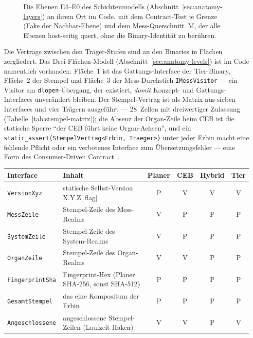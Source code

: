 \begin{nurkurz}
\begin{figure}[htbp]
\begin{tikzpicture}
\end{tikzpicture}
\caption[Die Ebenen E4--E0 im Code]{Die Ebenen E4--E0 des Schichtenmodells (Abschnitt~\ref{sec:anatomy-layers}) an ihrem Ort im Code,
mit dem Contract-Test je Grenze (Fake der Nachbar-Ebene) und dem Mess-Querschnitt~M, der alle Ebenen
host-seitig quert, ohne die Binary-Identität zu berühren.}\label{fig:impl-layers}
\end{figure}

Die Verträge zwischen den Träger-Stufen sind an den Binaries in Flächen zergliedert. Das
Drei-Flächen-Modell (Abschnitt~\ref{sec:anatomy-levels}) ist im Code namentlich vorhanden: Fläche~1 ist
das Gattungs-Interface der Tier-Binary, Fläche~2 der Stempel und Fläche~3 der Mess-Durchstich
\texttt{IMessVisitor} --- ein Visitor am \texttt{dlopen}-Übergang, der existiert, \emph{damit} Konzept-
und Gattungs-Interfaces unverändert bleiben. Der Stempel-Vertrag ist als Matrix aus sieben Interfaces und
vier Trägern ausgeführt --- 28~Zellen mit dreiwertiger Zulassung (Tabelle~\ref{tab:stempel-matrix}); die
Absenz der Organ-Zeile beim CEB ist die statische Sperre \enquote{der CEB führt keine Organ-Achsen}, und
ein \texttt{static\_assert(StempelVertrag<Erbin, Traeger>)} unter jeder Erbin macht eine fehlende Pflicht
oder ein verbotenes Interface zum Übersetzungsfehler --- eine Form des Consumer-Driven
Contract~\cite{robinson2006cdc}.
\begin{table}[htbp]\centering\footnotesize
\begin{tabular}{@{}llcccc@{}}
\toprule
Interface & Inhalt & Planer & CEB & Hybrid & Tier \\
\midrule
\texttt{VersionXyz}     & statische Selbst-Version X.Y.Z[.flag]            & P & V & V & V \\
\texttt{MessZeile}      & Stempel-Zeile des Mess-Realms                     & V & P & P & P \\
\texttt{SystemZeile}    & Stempel-Zeile des System-Realms                   & V & P & P & P \\
\texttt{OrganZeile}     & Stempel-Zeile des Organ-Realms                    & V & V & P & P \\
\texttt{FingerprintSha} & Fingerprint-Hex (Planer SHA-256, sonst SHA-512)   & P & P & P & P \\
\texttt{GesamtStempel}  & das eine Kompositum der Erbin                     & P & P & P & P \\
\texttt{Angeschlossene} & angeschlossene Stempel-Zeilen (Laufzeit-Haken)    & V & V & P & V \\

\end{tabular}
\end{table}
\end{nurkurz}
